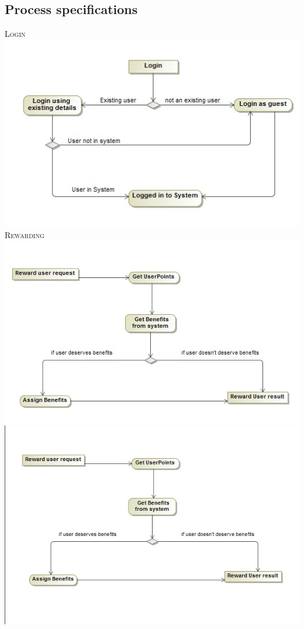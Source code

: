 \documentclass[a4paper,12pt]{report}
\begin{document}
\newpage
\subsection{Process specifications}
 
\textsc{Login}
\emph{}\\
\includegraphics[width=1\textwidth]{./Activity_Diagram_Login.jpg}\\[0.4cm]  

\textsc{Rewarding}
\emph{}\\
\includegraphics[width=1\textwidth]{./Activity_Diagram_RewardSystem.jpg}\\[0.4cm]
\includegraphics[width=1\textwidth]{./Activity_Diagram_RewardUser.jpg}\\[0.4cm] 
\end{document}
